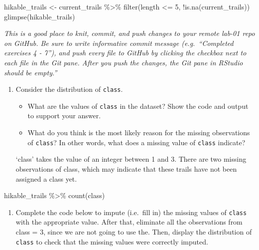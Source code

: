 \documentclass[
]{article}
\newenvironment{Shaded}{\begin{snugshade}}{\end{snugshade}}
\newcommand{\DecValTok}[1]{\textcolor[rgb]{0.00,0.00,0.81}{#1}}
\newcommand{\FunctionTok}[1]{\textcolor[rgb]{0.00,0.00,0.00}{#1}}
\newcommand{\NormalTok}[1]{#1}
\newcommand{\OtherTok}[1]{\textcolor[rgb]{0.56,0.35,0.01}{#1}}
\newcommand{\SpecialCharTok}[1]{\textcolor[rgb]{0.00,0.00,0.00}{#1}}
\providecommand{\tightlist}{%
  \setlength{\itemsep}{0pt}\setlength{\parskip}{0pt}}
\begin{document}
\begin{Shaded}
\begin{Highlighting}[]
\NormalTok{hikable\_trails }\OtherTok{\textless{}{-}}\NormalTok{ current\_trails }\SpecialCharTok{\%\textgreater{}\%}
  \FunctionTok{filter}\NormalTok{(length }\SpecialCharTok{\textless{}=} \DecValTok{5}\NormalTok{, }\SpecialCharTok{!}\FunctionTok{is.na}\NormalTok{(current\_trails))}
\FunctionTok{glimpse}\NormalTok{(hikable\_trails)}
\end{Highlighting}
\end{Shaded}

\emph{This is a good place to knit, commit, and push changes to your
remote lab-01 repo on GitHub. Be sure to write informative commit
message (e.g.~``Completed exercises 4 - 7''), and push every file to
GitHub by clicking the checkbox next to each file in the Git pane. After
you push the changes, the Git pane in RStudio should be empty.''}

\begin{enumerate}
\def\labelenumi{\arabic{enumi}.}
\setcounter{enumi}{7}
\tightlist
\item
  Consider the distribution of \texttt{class}.

  \begin{itemize}
  \tightlist
  \item
    What are the values of \texttt{class} in the dataset? Show the code
    and output to support your answer.
  \item
    What do you think is the most likely reason for the missing
    observations of \texttt{class}? In other words, what does a missing
    value of \texttt{class} indicate?
  \end{itemize}

  `class' takes the value of an integer between 1 and 3. There are two
  missing observations of class, which may indicate that these trails
  have not been assigned a class yet.
\end{enumerate}

\begin{Shaded}
\begin{Highlighting}[]
\NormalTok{hikable\_trails }\SpecialCharTok{\%\textgreater{}\%}
  \FunctionTok{count}\NormalTok{(class)}
\end{Highlighting}
\end{Shaded}

\begin{enumerate}
\def\labelenumi{\arabic{enumi}.}
\setcounter{enumi}{8}
\tightlist
\item
  Complete the code below to impute (i.e.~fill in) the missing values of
  \texttt{class} with the appropriate value. After that, eliminate all
  the observations from class = 3, since we are not going to use the.
  Then, display the distribution of \texttt{class} to check that the
  missing values were correctly imputed.
\end{enumerate}
\end{document}

